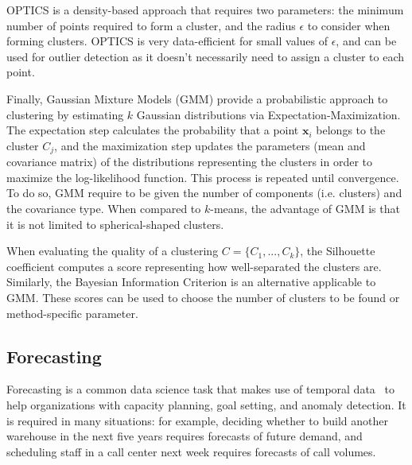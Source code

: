 \documentclass[a4paper, 12pt]{article} %
\begin{document}
	OPTICS \cite{OPTICS} is a density-based approach that requires two parameters: the minimum number of points required to form a cluster, and the radius $\epsilon$ to consider when forming clusters. OPTICS is very data-efficient for small values of $\epsilon$, and can be used for outlier detection as it doesn't necessarily need to assign a cluster to each point.
	
	Finally, Gaussian Mixture Models (GMM) \cite{MixtureModels} provide a probabilistic approach to clustering by estimating $k$ Gaussian distributions via Expectation-Maximization. The expectation step calculates the probability that a point $\pmb{x}_i$ belongs to the cluster $C_j$, and the maximization step updates the parameters (mean and covariance matrix) of the distributions representing the clusters in order to maximize the log-likelihood function. This process is repeated until convergence. To do so, GMM require to be given the number of components (i.e. clusters) and the covariance type. When compared to $k$-means, the advantage of GMM is that it is not limited to spherical-shaped clusters.
	
	When evaluating the quality of a clustering $C=\{C_1, ..., C_k\}$, the Silhouette coefficient \cite{SilhouetteCoefficient} computes a score representing how well-separated the clusters are. Similarly, the Bayesian Information Criterion \cite{BayesianInformationCriterion} is an alternative applicable to GMM. These scores can be used to choose the number of clusters to be found or method-specific parameter.
	
	\subsection{Forecasting } \label{sec:forecasting}
	Forecasting is a common data science task that makes use of temporal data~\cite{ForecastingSurvey} to help organizations with capacity planning, goal setting, and anomaly detection. It is required in many situations: for example, deciding whether to build another warehouse in the next five years requires forecasts of future demand, and scheduling staff in a call center next week requires forecasts of call volumes.
	
\end{document}

